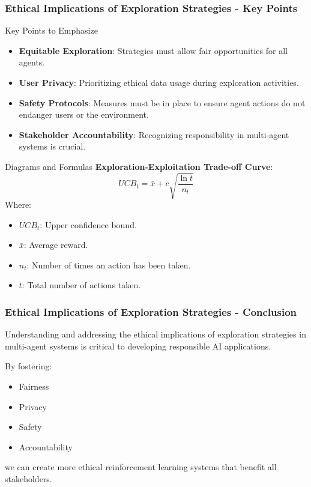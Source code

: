 \documentclass[aspectratio=169]{beamer}
\begin{document}
\begin{frame}[fragile]
    \frametitle{Ethical Implications of Exploration Strategies - Key Points}
    \begin{block}{Key Points to Emphasize}
        \begin{itemize}
            \item \textbf{Equitable Exploration}: Strategies must allow fair opportunities for all agents.
            \item \textbf{User Privacy}: Prioritizing ethical data usage during exploration activities.
            \item \textbf{Safety Protocols}: Measures must be in place to ensure agent actions do not endanger users or the environment.
            \item \textbf{Stakeholder Accountability}: Recognizing responsibility in multi-agent systems is crucial.
        \end{itemize}
    \end{block}
    
    \begin{block}{Diagrams and Formulas}
        \textbf{Exploration-Exploitation Trade-off Curve}:
        \begin{equation}
            UCB_t = \bar{x} + c \sqrt{\frac{\ln t}{n_t}}
        \end{equation}
        Where:
        \begin{itemize}
            \item \( UCB_t \): Upper confidence bound.
            \item \( \bar{x} \): Average reward.
            \item \( n_t \): Number of times an action has been taken.
            \item \( t \): Total number of actions taken.
        \end{itemize}
    \end{block}
\end{frame}

\begin{frame}[fragile]
    \frametitle{Ethical Implications of Exploration Strategies - Conclusion}
    Understanding and addressing the ethical implications of exploration strategies in multi-agent systems is critical to developing responsible AI applications. 

    By fostering:
    \begin{itemize}
        \item Fairness
        \item Privacy
        \item Safety
        \item Accountability
    \end{itemize}
    we can create more ethical reinforcement learning systems that benefit all stakeholders.
\end{frame}
\end{document}
